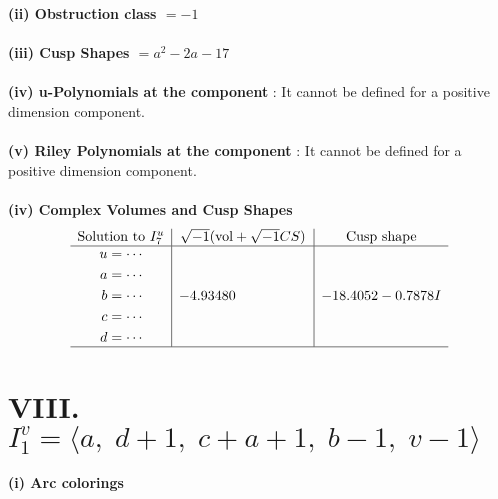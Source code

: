 \documentclass[1p]{elsarticle_modified}
\theoremstyle{definition}
\newcommand{\I}{\sqrt{-1}}
\begin{document}
\flushleft \textbf{(ii) Obstruction class $= -1$}\\~\\
\flushleft \textbf{(iii) Cusp Shapes $= a^2-2 a-17$}\\~\\
\flushleft \textbf{(iv) u-Polynomials at the component} : It cannot be defined for a positive dimension component.\\~\\
\flushleft \textbf{(v) Riley Polynomials at the component} : It cannot be defined for a positive dimension component.\\~\\
\newpage\flushleft \textbf{(iv) Complex Volumes and Cusp Shapes}
$$\begin{array}{c|c|c} 
\text{Solution to }I^u_{7}& \I (\text{vol} + \sqrt{-1}CS) & \text{Cusp shape}\\
 \hline 
\begin{aligned}
u &= \cdots \\
a &= \cdots \\
b &= \cdots \\
c &= \cdots \\
d &= \cdots\end{aligned}
 & -4.93480\phantom{ +0.000000I} & -18.4052 - 0.7878 I\\
 \hline 
 \end{array}
$$\newpage\renewcommand{\arraystretch}{1}
\centering \section*{VIII. $I^v_{1}= \langle a,\;d+1,\;c+a+1,\;b-1,\;v-1 \rangle$}
\flushleft \textbf{(i) Arc colorings}\\
\end{document}
